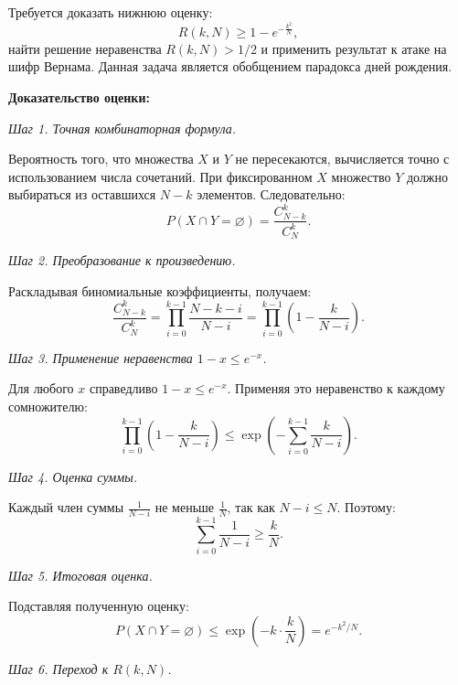 \documentclass[a4paper]{article}
\theoremstyle{definition}
\begin{document}
Требуется доказать нижнюю оценку:
\begin{equation}
    R(k, N) \ge 1 - e^{-\frac{k^2}{N}},
\end{equation}
найти решение неравенства $R(k, N) > 1/2$ и применить результат к атаке на шифр Вернама. Данная задача является обобщением парадокса дней рождения.

\textbf{Доказательство оценки:}

\textit{Шаг 1. Точная комбинаторная формула.}

Вероятность того, что множества $X$ и $Y$ не пересекаются, вычисляется точно с использованием числа сочетаний. При фиксированном $X$ множество $Y$ должно выбираться из оставшихся $N-k$ элементов. Следовательно:
\begin{equation}
    P(X \cap Y = \varnothing) = \frac{C_{N-k}^k}{C_N^k}.
\end{equation}

\textit{Шаг 2. Преобразование к произведению.}

Раскладывая биномиальные коэффициенты, получаем:
\begin{equation}
    \frac{C_{N-k}^k}{C_N^k} = \prod_{i=0}^{k-1} \frac{N-k-i}{N-i} = \prod_{i=0}^{k-1} \left(1 - \frac{k}{N-i}\right).
\end{equation}

\textit{Шаг 3. Применение неравенства $1-x \le e^{-x}$.}

Для любого $x$ справедливо $1-x \le e^{-x}$. Применяя это неравенство к каждому сомножителю:
\begin{equation}
    \prod_{i=0}^{k-1} \left(1 - \frac{k}{N-i}\right) \le \exp\left(-\sum_{i=0}^{k-1} \frac{k}{N-i}\right).
\end{equation}

\textit{Шаг 4. Оценка суммы.}

Каждый член суммы $\frac{1}{N-i}$ не меньше $\frac{1}{N}$, так как $N-i \le N$. Поэтому:
\begin{equation}
    \sum_{i=0}^{k-1} \frac{1}{N-i} \ge \frac{k}{N}.
\end{equation}

\textit{Шаг 5. Итоговая оценка.}

Подставляя полученную оценку:
\begin{equation}
    P(X \cap Y = \varnothing) \le \exp\left(-k \cdot \frac{k}{N}\right) = e^{-k^2/N}.
\end{equation}

\textit{Шаг 6. Переход к $R(k, N)$.}
\end{document}
